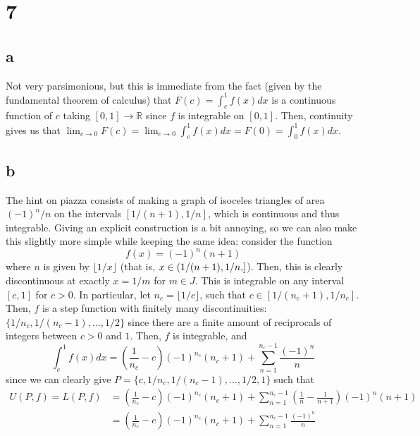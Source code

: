 \documentclass[12pt,letterpaper]{article}
\theoremstyle{definition}
\newcommand{\R}{\mathbb{R}}
\newcommand\openhalf[2]{\ensuremath{(#1,#2]}}
\begin{document}
\section*{7}

\subsection*{a}

Not very parsimonious, but this is immediate from the fact (given by the fundamental theorem of calculus) that $F(c) = \int_{c}^{1}f(x)dx$ is a continuous function of $c$ taking $[0,1] \rightarrow \R$ since $f$ is integrable on $[0, 1]$. Then, continuity gives us that $\lim_{c \rightarrow 0}F(c) = \lim_{c \rightarrow 0}\int_{c}^{1}f(x)dx = F(0) = \int_{0}^{1}f(x)dx$.



\subsection*{b}

The hint on piazza consists of making a graph of isoceles triangles of area $(-1)^{n}/n$ on the intervals $[1/(n+1), 1/n]$, which is continuous and thus integrable. Giving an explicit construction is a bit annoying, so we can also make this slightly more simple while keeping the same idea: consider the function
\[
  f(x) = (-1)^{n}(n+1)
\]
where $n$ is given by $\lfloor 1/x \rfloor$ (that is, $x \in \openhalf{1/(n+1), 1/n}$). Then, this is clearly discontinuous at exactly $x = 1/m$ for $m \in J$. This is integrable on any interval $[c,1]$ for $c > 0$. In particular, let $n_{c} = \lfloor 1/c \rfloor$, such that $c \in [1/(n_{c}+1), 1/n_{c}]$. Then, $f$ is a step function with finitely many discontinuities: $\{1/n_{c}, 1/(n_{c} - 1), \dots, 1/2\}$ since there are a finite amount of reciprocals of integers between $c > 0$ and $1$. Then, $f$ is integrable, and
\[
  \int_{c}^{1}f(x)dx = \left(\frac{1}{n_{c}} - c\right)(-1)^{n_{c}}(n_{c} + 1) + \sum_{n=1}^{n_{c}-1}\frac{(-1)^{n}}{n}
\]
since we can clearly give $P = \{c, 1/n_{c}, 1/(n_{c}-1), \dots, 1/2, 1\}$ such that
\begin{align*}
  U(P, f) = L(P, f) &= \left(\frac{1}{n_{c}} - c\right)(-1)^{n_{c}}(n_{c} + 1) + \sum_{n=1}^{n_{c}-1}\left(\frac{1}{n} - \frac{1}{n+1}\right)(-1)^{n}(n+1) \\
                    &= \left(\frac{1}{n_{c}} - c\right)(-1)^{n_{c}}(n_{c} + 1) + \sum_{n=1}^{n_{c}-1}\frac{(-1)^{n}}{n}
\end{align*}
\end{document}
